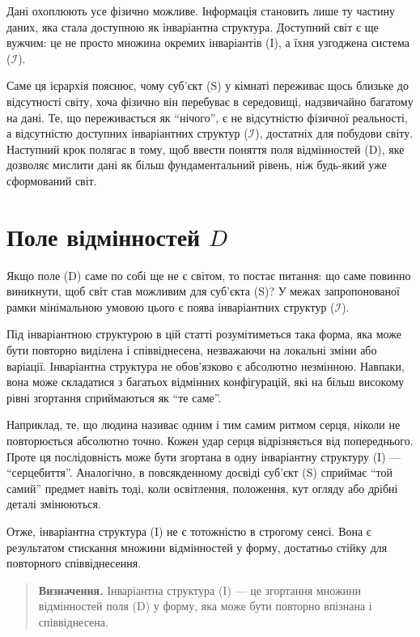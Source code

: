 \documentclass[aps,prd,onecolumn,nofootinbib,superscriptaddress]{revtex4-2} %
\begin{document}
    Дані охоплюють усе фізично можливе. Інформація становить лише ту частину даних, яка стала доступною як інваріантна структура. Доступний світ є ще вужчим: це не просто множина окремих інваріантів (I), а їхня узгоджена система ($\mathcal{I}$).

    Саме ця ієрархія пояснює, чому суб’єкт (S) у кімнаті переживає щось близьке до відсутності світу, хоча фізично він перебуває в середовищі, надзвичайно багатому на дані. Те, що переживається як “нічого”, є не відсутністю фізичної реальності, а відсутністю доступних інваріантних структур ($\mathcal{I}$), достатніх для побудови світу. Наступний крок полягає в тому, щоб ввести поняття поля відмінностей (D), яке дозволяє мислити дані як більш фундаментальний рівень, ніж будь-який уже сформований світ.


    \section{Поле відмінностей \texorpdfstring{$D$}{D}}
    Якщо поле (D) саме по собі ще не є світом, то постає питання: що саме повинно виникнути, щоб світ став можливим для суб’єкта (S)? У межах запропонованої рамки мінімальною умовою цього є поява інваріантних структур ($\mathcal{I}$).

    Під інваріантною структурою в цій статті розумітиметься така форма, яка може бути повторно виділена і співвіднесена, незважаючи на локальні зміни або варіації. Інваріантна структура не обов’язково є абсолютно незмінною. Навпаки, вона може складатися з багатьох відмінних конфігурацій, які на більш високому рівні згортання сприймаються як “те саме”.

    Наприклад, те, що людина називає одним і тим самим ритмом серця, ніколи не повторюється абсолютно точно. Кожен удар серця відрізняється від попереднього. Проте ця послідовність може бути згортана в одну інваріантну структуру (I) — “серцебиття”. Аналогічно, в повсякденному досвіді суб’єкт (S) сприймає “той самий” предмет навіть тоді, коли освітлення, положення, кут огляду або дрібні деталі змінюються.

    Отже, інваріантна структура (I) не є тотожністю в строгому сенсі. Вона є результатом стискання множини відмінностей у форму, достатньо стійку для повторного співвіднесення.

    \begin{quote}
        \textbf{Визначення.}
        Інваріантна структура (I) — це згортання множини відмінностей поля (D) у форму, яка може бути повторно впізнана і співвіднесена.
    \end{quote}
\end{document}
